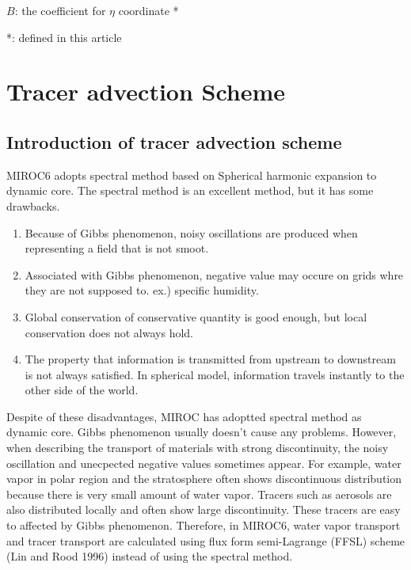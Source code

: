 $B$: the coefficient for $\eta$ coordinate *                       
                                                                           
  *: defined in this article    
\section{Tracer advection Scheme}
\subsection{Introduction of tracer advection scheme}
MIROC6 adopts spectral method based on Spherical harmonic expansion to dynamic core.
The spectral method is an excellent method, but it has some drawbacks.
\begin{enumerate}
\item Because of Gibbs phenomenon, noisy oscillations are produced when representing a field that is not smoot. 
\item Associated with Gibbs phenomenon, negative value may occure on grids whre they are not supposed to. ex.) specific humidity.
\item Global conservation of conservative quantity is good enough, but local conservation does not always hold.
\item The property that information is transmitted from upstream to downstream is not always satisfied. In spherical model, information travels instantly to the other side of the world.
\end{enumerate}
Despite of these disadvantages, MIROC has adoptted spectral method as dynamic core.
Gibbs phenomenon usually doesn't cause any problems. 
However, when describing the transport of materials with strong discontinuity, the noisy oscillation and unecpected negative values sometimes appear.
For example, water vapor in polar region and the stratosphere often shows discontinuous distribution because there is very small amount of water vapor.
Tracers such as aerosols are also distributed locally and often show large discontinuity.
These tracers are easy to affected by Gibbs phenomenon.
Therefore, in MIROC6, water vapor transport and tracer transport are calculated using flux form semi-Lagrange (FFSL) scheme (Lin and Rood 1996) instead of using the spectral method.

